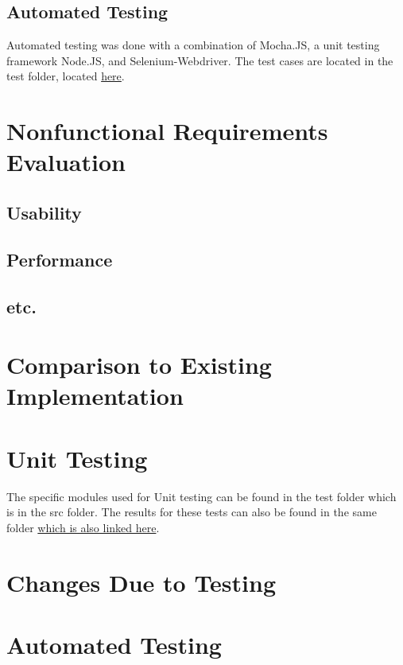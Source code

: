 \documentclass[12pt, titlepage]{article}
\begin{document}
\subsection{Automated Testing}


Automated testing was done with a combination of Mocha.JS, a unit testing framework Node.JS, and Selenium-Webdriver. The test cases are located in the test folder, located \href{https://gitlab.cas.mcmaster.ca/velechva/DJS/tree/master/src/test}{here}. 



\section{Nonfunctional Requirements Evaluation}

\subsection{Usability}
		
\subsection{Performance}

\subsection{etc.}
	
\section{Comparison to Existing Implementation}	


\section{Unit Testing}
The specific modules used for Unit testing can be found in the test folder which is in the src folder. The results for these tests can also be found in the same folder \href{run:../../src/test/Test-Report-001-12-1-2016.PNG}{which is also linked here}.

\section{Changes Due to Testing}

\section{Automated Testing}
\end{document}
